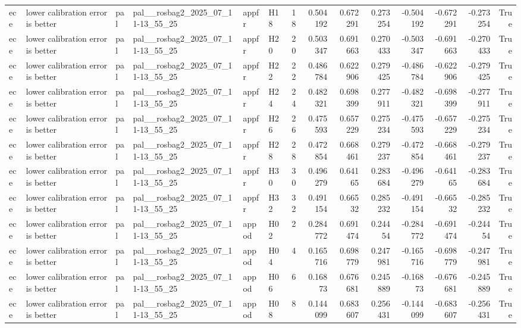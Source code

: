 \begin{longtable}{llllllrrrrrrrr}
ece & lower calibration error is better & pal & pal\_\_rosbag2\_2025\_07\_11-13\_55\_25 & appfr & H18 & 18 & 0.504192 & 0.672291 & 0.273254 & -0.504192 & -0.672291 & -0.273254 & True \\
ece & lower calibration error is better & pal & pal\_\_rosbag2\_2025\_07\_11-13\_55\_25 & appfr & H20 & 20 & 0.503347 & 0.691663 & 0.270433 & -0.503347 & -0.691663 & -0.270433 & True \\
ece & lower calibration error is better & pal & pal\_\_rosbag2\_2025\_07\_11-13\_55\_25 & appfr & H22 & 22 & 0.486784 & 0.622906 & 0.279425 & -0.486784 & -0.622906 & -0.279425 & True \\
ece & lower calibration error is better & pal & pal\_\_rosbag2\_2025\_07\_11-13\_55\_25 & appfr & H24 & 24 & 0.482321 & 0.698399 & 0.277911 & -0.482321 & -0.698399 & -0.277911 & True \\
ece & lower calibration error is better & pal & pal\_\_rosbag2\_2025\_07\_11-13\_55\_25 & appfr & H26 & 26 & 0.475593 & 0.657229 & 0.275234 & -0.475593 & -0.657229 & -0.275234 & True \\
ece & lower calibration error is better & pal & pal\_\_rosbag2\_2025\_07\_11-13\_55\_25 & appfr & H28 & 28 & 0.472854 & 0.668461 & 0.279237 & -0.472854 & -0.668461 & -0.279237 & True \\
ece & lower calibration error is better & pal & pal\_\_rosbag2\_2025\_07\_11-13\_55\_25 & appfr & H30 & 30 & 0.496279 & 0.64165 & 0.283684 & -0.496279 & -0.64165 & -0.283684 & True \\
ece & lower calibration error is better & pal & pal\_\_rosbag2\_2025\_07\_11-13\_55\_25 & appfr & H32 & 32 & 0.491154 & 0.66532 & 0.285232 & -0.491154 & -0.66532 & -0.285232 & True \\
ece & lower calibration error is better & pal & pal\_\_rosbag2\_2025\_07\_11-13\_55\_25 & appod & H02 & 2 & 0.284772 & 0.691474 & 0.24454 & -0.284772 & -0.691474 & -0.24454 & True \\
ece & lower calibration error is better & pal & pal\_\_rosbag2\_2025\_07\_11-13\_55\_25 & appod & H04 & 4 & 0.165716 & 0.698779 & 0.247981 & -0.165716 & -0.698779 & -0.247981 & True \\
ece & lower calibration error is better & pal & pal\_\_rosbag2\_2025\_07\_11-13\_55\_25 & appod & H06 & 6 & 0.16873 & 0.676681 & 0.245889 & -0.16873 & -0.676681 & -0.245889 & True \\
ece & lower calibration error is better & pal & pal\_\_rosbag2\_2025\_07\_11-13\_55\_25 & appod & H08 & 8 & 0.144099 & 0.683607 & 0.256431 & -0.144099 & -0.683607 & -0.256431 & True \\

\end{longtable}
